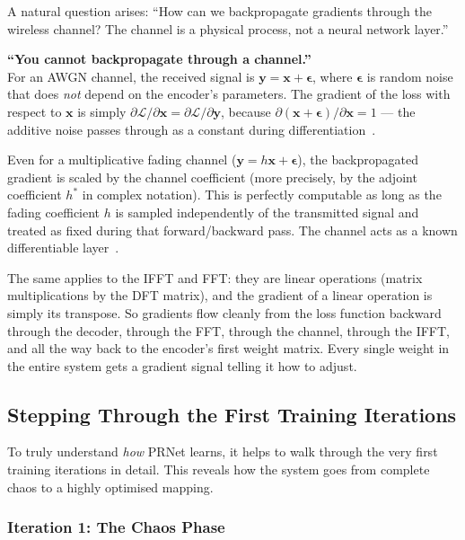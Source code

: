 A natural question arises: ``How can we backpropagate gradients through
the wireless channel?  The channel is a physical process, not a neural
network layer.''

\begin{misconception}
    \textbf{``You cannot backpropagate through a channel.''} \\
    For an AWGN channel, the received signal is
    $\bm{y} = \bm{x} + \bm{\epsilon}$, where $\bm{\epsilon}$ is random
    noise that does \emph{not} depend on the encoder's parameters.
    The gradient of the loss with respect to $\bm{x}$ is simply
    $\partial\mathcal{L}/\partial\bm{x}
    = \partial\mathcal{L}/\partial\bm{y}$,
    because $\partial(\bm{x} + \bm{\epsilon})/\partial\bm{x} = 1$ ---
    the additive noise passes through as a constant during
    differentiation~\cite{kim2017novel}.

    Even for a multiplicative fading channel
    ($\bm{y} = h\bm{x} + \bm{\epsilon}$), the backpropagated gradient is
    scaled by the channel coefficient (more precisely, by the adjoint
    coefficient $h^*$ in complex notation).  This is perfectly computable as
    long as the fading coefficient $h$ is sampled independently of the
    transmitted signal and treated as fixed during that forward/backward pass.
    The channel acts as a known differentiable layer~\cite{kim2017novel}.
\end{misconception}

The same applies to the IFFT and FFT: they are linear operations (matrix
multiplications by the DFT matrix), and the gradient of a linear operation
is simply its transpose.  So gradients flow cleanly from the loss function
backward through the decoder, through the FFT, through the channel,
through the IFFT, and all the way back to the encoder's first weight
matrix.  Every single weight in the entire system gets a gradient signal
telling it how to adjust.


\subsection{Stepping Through the First Training Iterations}
\label{sec:prnet_training_walkthrough}

To truly understand \emph{how} PRNet learns, it helps to walk through the
very first training iterations in detail.  This reveals how the system
goes from complete chaos to a highly optimised mapping.

\subsubsection{Iteration 1: The Chaos Phase}


